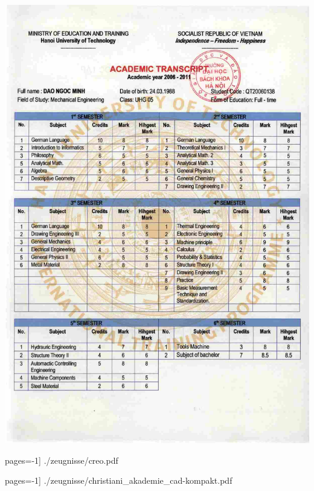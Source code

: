 \documentclass[12pt,a4paper]{scrartcl}
\begin{document}
\newpage
{}
\includegraphics [width=\linewidth, height=\textheight] {./zeugnisse/hust_bachelor_noten_eng_lq.jpg}%

\newpage
{}

\newpage
{}

 pages=-1] {./zeugnisse/creo.pdf}

 pages=-1] {./zeugnisse/christiani_akademie_cad-kompakt.pdf}
\end{document}
